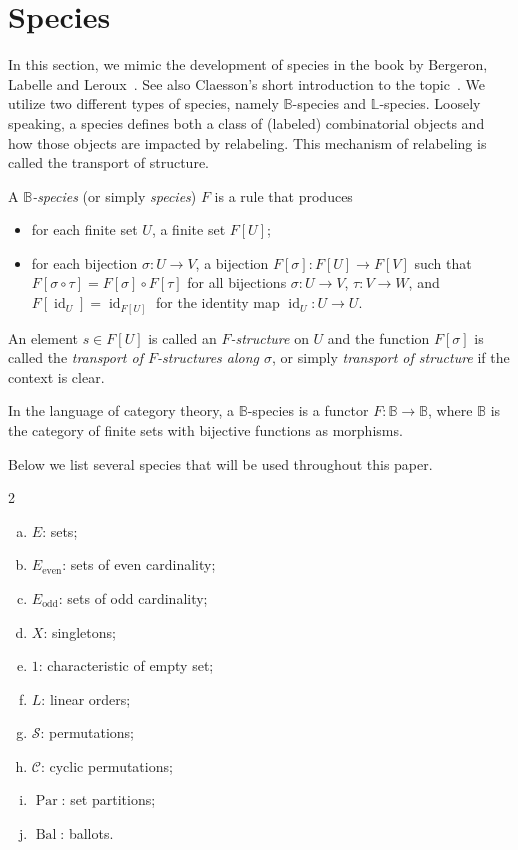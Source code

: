 \documentclass[a4paper, 11pt]{article}
\DeclareMathOperator{\Bal}{Bal}
\DeclareMathOperator{\id}{id}
\DeclareMathOperator{\Par}{Par}
\newcommand{\LL}{\mathbb{L}}
\newcommand{\BB}{\mathbb{B}}
\newcommand{\Cyc}{\mathcal{C}}
\newcommand{\Sym}{\mathcal{S}}
\newcommand{\Even}[1]{#1_{\mathrm{even}}}
\newcommand{\Odd}[1]{#1_{\mathrm{odd}}}
\theoremstyle{definition}
\begin{document}
\section{Species}\label{sec:Species}

In this section, we mimic the development of species in
the book by Bergeron, Labelle and Leroux~\cite{holybook}. See also
Claesson's short introduction to the topic~\cite{12foldway}.
We utilize two different types of species, namely
$\BB$-species and $\LL$-species.  Loosely speaking, a species
defines both a class of (labeled) combinatorial objects and how those
objects are impacted by relabeling. This mechanism of relabeling is
called the transport of structure.

A \emph{$\BB$-species} (or simply \emph{species}) $F$ is a rule
that produces
\begin{itemize}
\item for each finite set $U$, a finite set $F[U]$;
\item for each bijection $\sigma: U \rightarrow V$, a bijection
  $F[\sigma]: F[U] \rightarrow F[V]$ such that
  $F[\sigma \circ \tau] = F[\sigma]\circ F[\tau]$ for all bijections
  $\sigma: U \rightarrow V$, $\tau: V \rightarrow W$, and
  $F[\id_U] = \id_{F[U]}$ for the identity map $\id_U: U \rightarrow U$.
\end{itemize}

An element $s \in F[U]$ is called an \emph{$F$-structure} on $U$ and the
function $F[\sigma]$ is called the \emph{transport of $F$-structures
  along $\sigma$}, or simply \emph{transport of structure} if the
context is clear. 

In the language of category theory, a $\BB$-species is a functor
$F: \BB \to \BB$, where $\BB$ is the category of
finite sets with bijective functions as morphisms.

Below we list several species that will be used throughout this
paper.
\begin{multicols}{2}
\begin{enumerate}[(a)]
\item $E$: sets;
\item\label{E_{even} species} $\Even{E}$: sets of even cardinality;
\item $\Odd{E}$: sets of odd cardinality;
\item $X$: singletons;
\item $1$: characteristic of empty set;
\item $L$:  linear orders;
\item $\Sym$: permutations;
\item $\Cyc$: cyclic permutations;
\item $\Par$: set partitions;
\item $\Bal$: ballots.
\end{enumerate}
\end{multicols}
\end{document}
